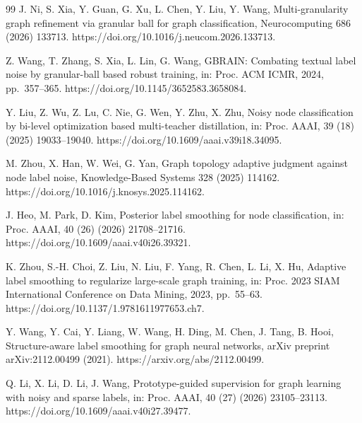 \begin{thebibliography}{99}
J. Ni, S. Xia, Y. Guan, G. Xu, L. Chen, Y. Liu, Y. Wang, Multi-granularity graph refinement via granular ball for graph classification, Neurocomputing 686 (2026) 133713. https://doi.org/10.1016/j.neucom.2026.133713.

Z. Wang, T. Zhang, S. Xia, L. Lin, G. Wang, GBRAIN: Combating textual label noise by granular-ball based robust training, in: Proc. ACM ICMR, 2024, pp.~357--365. https://doi.org/10.1145/3652583.3658084.

Y. Liu, Z. Wu, Z. Lu, C. Nie, G. Wen, Y. Zhu, X. Zhu, Noisy node classification by bi-level optimization based multi-teacher distillation, in: Proc. AAAI, 39 (18) (2025) 19033--19040. https://doi.org/10.1609/aaai.v39i18.34095.

M. Zhou, X. Han, W. Wei, G. Yan, Graph topology adaptive judgment against node label noise, Knowledge-Based Systems 328 (2025) 114162. https://doi.org/10.1016/j.knosys.2025.114162.

J. Heo, M. Park, D. Kim, Posterior label smoothing for node classification, in: Proc. AAAI, 40 (26) (2026) 21708--21716. https://doi.org/10.1609/aaai.v40i26.39321.

K. Zhou, S.-H. Choi, Z. Liu, N. Liu, F. Yang, R. Chen, L. Li, X. Hu, Adaptive label smoothing to regularize large-scale graph training, in: Proc. 2023 SIAM International Conference on Data Mining, 2023, pp.~55--63. https://doi.org/10.1137/1.9781611977653.ch7.

Y. Wang, Y. Cai, Y. Liang, W. Wang, H. Ding, M. Chen, J. Tang, B. Hooi, Structure-aware label smoothing for graph neural networks, arXiv preprint arXiv:2112.00499 (2021). https://arxiv.org/abs/2112.00499.

Q. Li, X. Li, D. Li, J. Wang, Prototype-guided supervision for graph learning with noisy and sparse labels, in: Proc. AAAI, 40 (27) (2026) 23105--23113. https://doi.org/10.1609/aaai.v40i27.39477.

\end{thebibliography}
